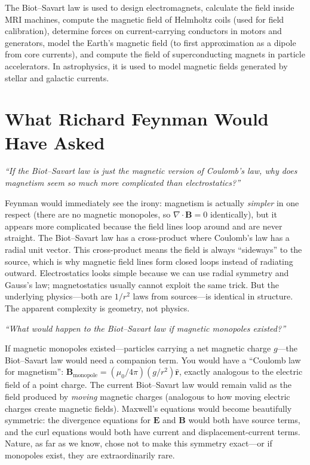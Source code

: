 \documentclass[11pt,openright]{book}
\begin{document}
The Biot--Savart law is used to design electromagnets, calculate the field inside MRI machines, compute the magnetic field of Helmholtz coils (used for field calibration), determine forces on current-carrying conductors in motors and generators, model the Earth's magnetic field (to first approximation as a dipole from core currents), and compute the field of superconducting magnets in particle accelerators. In astrophysics, it is used to model magnetic fields generated by stellar and galactic currents.
\section*{What Richard Feynman Would Have Asked}

\textit{``If the Biot--Savart law is just the magnetic version of Coulomb's law, why does magnetism seem so much more complicated than electrostatics?''}

Feynman would immediately see the irony: magnetism is actually \emph{simpler} in one respect (there are no magnetic monopoles, so $\nabla\cdot\mathbf{B} = 0$ identically), but it appears more complicated because the field lines loop around and are never straight. The Biot--Savart law has a cross-product where Coulomb's law has a radial unit vector. This cross-product means the field is always ``sideways'' to the source, which is why magnetic field lines form closed loops instead of radiating outward. Electrostatics looks simple because we can use radial symmetry and Gauss's law; magnetostatics usually cannot exploit the same trick. But the underlying physics---both are $1/r^2$ laws from sources---is identical in structure. The apparent complexity is geometry, not physics.

\textit{``What would happen to the Biot--Savart law if magnetic monopoles existed?''}

If magnetic monopoles existed---particles carrying a net magnetic charge $g$---the Biot--Savart law would need a companion term. You would have a ``Coulomb law for magnetism'': $\mathbf{B}_{\text{monopole}} = (\mu_0/4\pi)(g/r^2)\hat{\mathbf{r}}$, exactly analogous to the electric field of a point charge. The current Biot--Savart law would remain valid as the field produced by \emph{moving} magnetic charges (analogous to how moving electric charges create magnetic fields). Maxwell's equations would become beautifully symmetric: the divergence equations for $\mathbf{E}$ and $\mathbf{B}$ would both have source terms, and the curl equations would both have current and displacement-current terms. Nature, as far as we know, chose not to make this symmetry exact---or if monopoles exist, they are extraordinarily rare.
\end{document}
